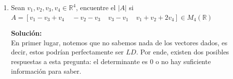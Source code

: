 \documentclass[12pt]{article}
\newenvironment{solucion}
{\begin{mdframed}[backgroundcolor=black!10]
		{\bf Solución:}\\
	}
	{
	\end{mdframed}
}
\newenvironment{preguntas}
{\begin{enumerate}\itemsep12pt
	}
	{
	\end{enumerate}
}
\newcommand{\R}{\mathbb{R}}
\begin{document}
\begin{preguntas}
\begin{solucion}
		$$ \left|\begin{bmatrix}
		-3 & x & x & \dots & x \\
		0 & -3-x & 0 & \dots & x+3 \\
		0 & 0 & -3 & \dots & x+3 \\
		\vdots & \vdots & \vdots & \ddots & \vdots \\
		x & x & x & \dots & -3
		\end{bmatrix}\right|$$
		En segundo lugar, haremos $f_n-f_1$
		$$ \left|\begin{bmatrix}
		-3 & x & x & \dots & x \\
		0 & -3-x & 0 & \dots & x+3 \\
		0 & 0 & -3 & \dots & x+3 \\
		\vdots & \vdots & \vdots & \ddots & \vdots \\
		x+3 & 0 & 0 & \dots & -3-x
		\end{bmatrix}\right|$$
		Recordemos que el determinante de una matriz es el mismo que de su transpuesta, por lo que podemos también realizar operaciones de columnas al igual como lo hacemos con las filas. Dicho esto, haremos $c_1 + c_n$,
		$$ \left|\begin{bmatrix}
		-3+x & x & x & \dots & x \\
		x+3 & -3-x & 0 & \dots & x+3 \\
		x+3 & 0 & -3 & \dots & x+3 \\
		\vdots & \vdots & \vdots & \ddots & \vdots \\
		0 & 0 & 0 & \dots & -3-x
		\end{bmatrix}\right|$$
		Por último, realizaremos las operaciones $c_1 + c_2$, $c_1 +c_3$, \dots, $c_1 + c_{n-1}$
		$$ \left|\begin{bmatrix}
		-3+x(n-1) & x & x & \dots & x \\
		0 & -3-x & 0 & \dots & x+3 \\
		0 & 0 & -3 & \dots & x+3 \\
		\vdots & \vdots & \vdots & \ddots & \vdots \\
		0 & 0 & 0 & \dots & -3-x
		\end{bmatrix}\right|$$
		Aqui ya podemos multiplicar la diagonal de esta matriz, con lo que el determinante nos queda
		$$det = (-3 + x(n-1)) \cdot (-3-x)^{n-1} = (-3-x)^n + xn(-3-x)^{n-1}$$
\end{solucion}
\item Sean $v_1,v_2,v_3,v_4 \in \R^4$, encuentre el $|A|$ si\\
$A=[v_1-v_3+v_4 \;\;\;\;-v_2-v_3 \;\;\;\; v_3-v_1
\;\;\;\;v_1+v_2+2v_4 ]\in M_4 (\R)$
\begin{solucion}
En primer lugar, notemos que no sabemos nada de los vectores dados, es decir, estos podrían perfectamente ser $LD$. Por ende, existen dos posibles respuestas a esta pregunta: el determinante es 0 o no hay suficiente información para saber.\\


\end{solucion}
\end{preguntas}
\end{document}
